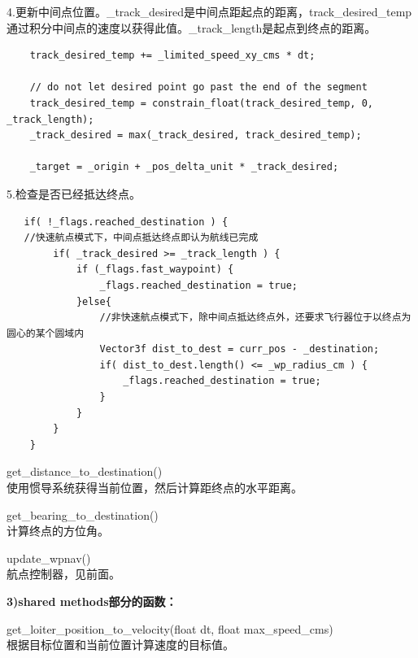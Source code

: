 \documentclass[a4paper,10pt]{ctexart} %
\begin{document}
4.更新中间点位置。\_track\_desired是中间点距起点的距离，track\_desired\_temp通过积分中间点的速度以获得此值。\_track\_length是起点到终点的距离。
\begin{lstlisting}
    track_desired_temp += _limited_speed_xy_cms * dt;

    // do not let desired point go past the end of the segment
    track_desired_temp = constrain_float(track_desired_temp, 0, _track_length);
    _track_desired = max(_track_desired, track_desired_temp);

    _target = _origin + _pos_delta_unit * _track_desired;
\end{lstlisting}
5.检查是否已经抵达终点。
\begin{lstlisting}
   if( !_flags.reached_destination ) {
   //快速航点模式下，中间点抵达终点即认为航线已完成
        if( _track_desired >= _track_length ) {
            if (_flags.fast_waypoint) {
    		    _flags.reached_destination = true;
            }else{
                //非快速航点模式下，除中间点抵达终点外，还要求飞行器位于以终点为圆心的某个圆域内
                Vector3f dist_to_dest = curr_pos - _destination;
                if( dist_to_dest.length() <= _wp_radius_cm ) {
                    _flags.reached_destination = true;
                }
            }
        }
    }
\end{lstlisting}


\vspace{8pt}
\noindent get\_distance\_to\_destination()\\
使用惯导系统获得当前位置，然后计算距终点的水平距离。

\vspace{8pt}
\noindent get\_bearing\_to\_destination()\\
计算终点的方位角。

\vspace{8pt}
\noindent update\_wpnav()\\
航点控制器，见前面。

\vspace{20pt}
\noindent \textbf{\large 3)shared methods部分的函数：}

\noindent get\_loiter\_position\_to\_velocity(float dt, float max\_speed\_cms)\\
根据目标位置和当前位置计算速度的目标值。
\end{document}
